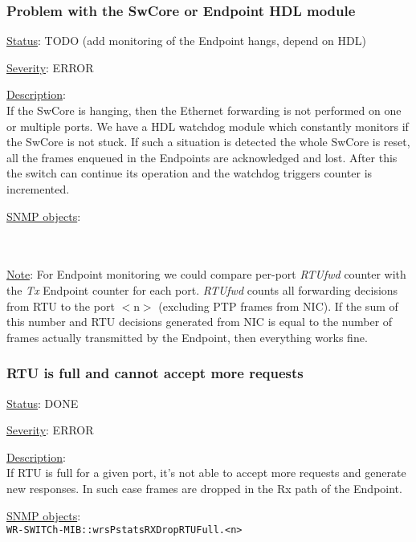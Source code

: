 \subsubsection{\bf Problem with the SwCore or Endpoint HDL module}
		\label{fail:data:swcore_hang}
		\begin{packed_enum}
    \item [] \underline{Status}: TODO (add monitoring of the Endpoint hangs, depend on
      HDL)
			\item [] \underline{Severity}: ERROR
			\item [] \underline{Description}:\\
				If the SwCore is hanging, then the Ethernet forwarding is not
				performed on one or multiple ports. We have a HDL watchdog module which
				constantly monitors if the SwCore is not stuck. If such a situation is
				detected the whole SwCore is reset, all the frames enqueued in the
				Endpoints are acknowledged and lost. After this the switch can continue
				its operation and the watchdog triggers counter is incremented.
			\item [] \underline{SNMP objects}:\\
				\\
				\\
			\item [] \underline{Note}: For Endpoint monitoring we could compare
				per-port \emph{RTUfwd} counter with the \emph{Tx} Endpoint counter for
				each port. \emph{RTUfwd} counts all forwarding decisions from RTU to the
				port $<$n$>$ (excluding PTP frames from NIC). If the sum of this number
				and RTU decisions generated from NIC is equal to the number of frames
				actually transmitted by the Endpoint, then everything works fine.
		\end{packed_enum}

\subsubsection{\bf RTU is full and cannot accept more requests}
		\label{fail:data:rtu_full}
		\begin{packed_enum}
			\item [] \underline{Status}: DONE
			\item [] \underline{Severity}: ERROR
			\item [] \underline{Description}:\\
				If RTU is full for a given port, it's not able to accept more requests
				and generate new responses. In such case frames are dropped in the
				Rx path of the Endpoint.
			\item [] \underline{SNMP objects}:\\
				\texttt{WR-SWITCh-MIB::wrsPstatsRXDropRTUFull.<n>}
		\end{packed_enum}

